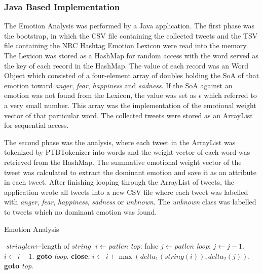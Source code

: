 \subsubsection{Java Based Implementation}
The Emotion Analysis was performed by a Java application. The first phase was the bootstrap, in which the CSV file containing the collected tweets and the TSV file containing the NRC Hashtag Emotion Lexicon were read into the memory. The Lexicon was stored as a HashMap for random access with the word served as the key of each record in the HashMap. The value of each record was an Word Object which consisted of a four-element array of doubles holding the SoA of that emotion toward \textit{anger}, \textit{fear}, \textit{happiness} and \textit{sadness}. If the SoA against an emotion was not found from the Lexicon, the value was set as \(\epsilon\) which referred to a very small number. This array was the implementation of the emotional weight vector of that particular word. The collected tweets were stored as an ArrayList for sequential access. 

The second phase was the analysis, where each tweet in the ArrayList was tokenized by PTBTokenizer into words and the weight vector of each word was retrieved from the HashMap. The summative emotional weight vector of the tweet was calculated to extract the dominant emotion and save it as an attribute in each tweet. After finishing looping through the ArrayList of tweets, the application wrote all tweets into a new CSV file where each tweet was labelled with \textit{anger}, \textit{fear}, \textit{happiness}, \textit{sadness} or \textit{unknown}. The \textit{unknown} class was labelled to tweets which no dominant emotion was found.

\begin{algorithm}
\caption{Emotion Analysis}
\label{algorith:pseudocode}
\begin{algorithmic}[1]
\State $\textit{stringlen} \gets \text{length of }\textit{string}$
\State $i \gets \textit{patlen}$
\BState \emph{top}:
 \Return false
\EndIf
\State $j \gets \textit{patlen}$
\BState \emph{loop}:
\State $j \gets j-1$.
\State $i \gets i-1$.
\State \textbf{goto} \emph{loop}.
\State \textbf{close};
\EndIf
\State $i \gets i+\max(\textit{delta}_1(\textit{string}(i)),\textit{delta}_2(j))$.
\State \textbf{goto} \emph{top}.
\EndProcedure
\end{algorithmic}
\end{algorithm}

